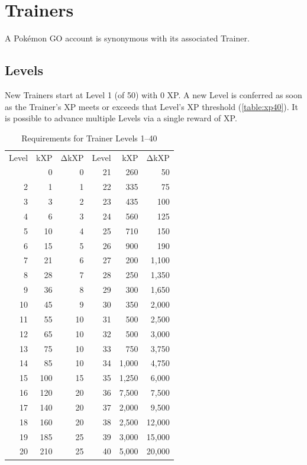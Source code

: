 \chapter{Trainers}
A Pokémon GO account is synonymous with its associated Trainer.

\section{Levels}
\label{sec:levels}
New Trainers start at Level 1 (of 50) with 0 XP\@.
A new Level is conferred as soon as the Trainer's XP meets or exceeds
  that Level's XP threshold (\autoref{table:xp40}).
It is possible to advance multiple Levels via a single reward of XP\@.
\begin{table}[hb]
\begin{center}
\begin{tabular}{r r r|r r r}
  Level & kXP & ΔkXP & Level & kXP & ΔkXP \\
\Midrule
1 & 0 & 0 & 21 & 260 & 50 \\
2 & 1 & 1 & 22 & 335 & 75 \\
3 & 3 & 2 & 23 & 435 & 100 \\
4 & 6 & 3 & 24 & 560 & 125 \\
5 & 10 & 4 & 25 & 710 & 150 \\
6 & 15 & 5 & 26 & 900 & 190 \\
7 & 21 & 6 & 27 & 200 & 1,100 \\
8 & 28 & 7 & 28 & 250 & 1,350 \\
9 & 36 & 8 & 29 & 300 & 1,650 \\
10 & 45 & 9 & 30 & 350 & 2,000 \\
11 & 55 & 10 & 31 & 500 & 2,500 \\
12 & 65 & 10 & 32 & 500 & 3,000 \\
13 & 75 & 10 & 33 & 750 & 3,750 \\
14 & 85 & 10 & 34 & 1,000 & 4,750 \\
15 & 100 & 15 & 35 & 1,250 & 6,000 \\
16 & 120 & 20 & 36 & 7,500 & 7,500 \\
17 & 140 & 20 & 37 & 2,000 & 9,500 \\
18 & 160 & 20 & 38 & 2,500 & 12,000 \\
19 & 185 & 25 & 39 & 3,000 & 15,000 \\
20 & 210 & 25 & 40 & 5,000 & 20,000 \\
\end{tabular}
\caption{Requirements for Trainer Levels 1--40}
\label{table:xp40}
\end{center}
\end{table}
